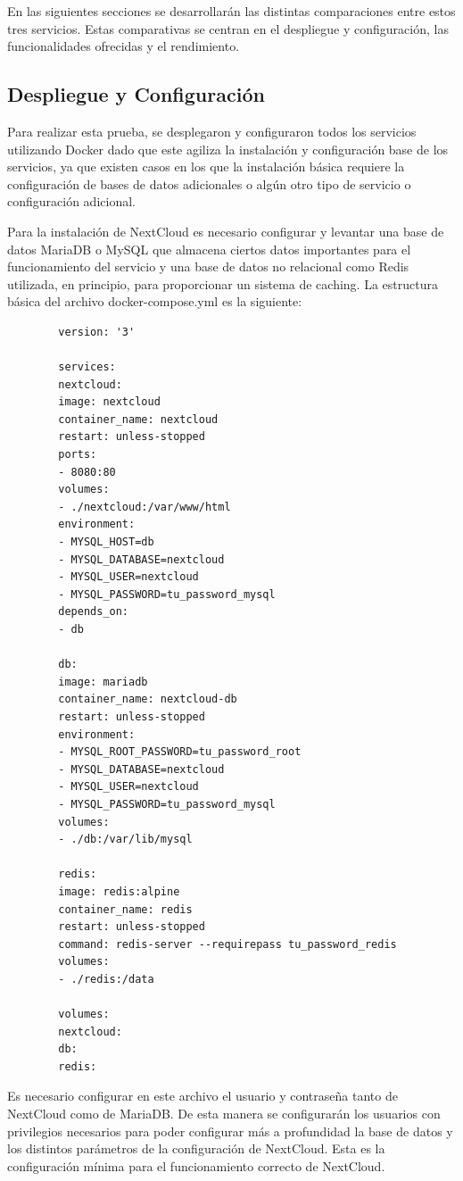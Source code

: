 \documentclass[a4paper,10pt]{article}
\begin{document}
	En las siguientes secciones se desarrollarán las distintas comparaciones entre estos tres servicios. Estas comparativas se centran en el despliegue y configuración, las funcionalidades ofrecidas y el rendimiento.
	
	\subsection{Despliegue y Configuración}
	Para realizar esta prueba, se desplegaron y configuraron todos los servicios utilizando Docker dado que este agiliza la instalación y configuración base de los servicios, ya que existen casos en los que la instalación básica requiere la configuración de bases de datos adicionales o algún otro tipo de servicio o configuración adicional.

	Para la instalación de NextCloud es necesario configurar y levantar una base de datos MariaDB o MySQL que almacena ciertos datos importantes para el funcionamiento del servicio y una base de datos no relacional como Redis utilizada, en principio, para proporcionar un sistema de caching. La estructura básica del archivo docker-compose.yml es la siguiente:

	
	\begin{verbatim}
		version: '3'
		
		services:
		nextcloud:
		image: nextcloud
		container_name: nextcloud
		restart: unless-stopped
		ports:
		- 8080:80
		volumes:
		- ./nextcloud:/var/www/html
		environment:
		- MYSQL_HOST=db
		- MYSQL_DATABASE=nextcloud
		- MYSQL_USER=nextcloud
		- MYSQL_PASSWORD=tu_password_mysql
		depends_on:
		- db
		
		db:
		image: mariadb
		container_name: nextcloud-db
		restart: unless-stopped
		environment:
		- MYSQL_ROOT_PASSWORD=tu_password_root
		- MYSQL_DATABASE=nextcloud
		- MYSQL_USER=nextcloud
		- MYSQL_PASSWORD=tu_password_mysql
		volumes:
		- ./db:/var/lib/mysql
		
		redis:
		image: redis:alpine
		container_name: redis
		restart: unless-stopped
		command: redis-server --requirepass tu_password_redis
		volumes:
		- ./redis:/data
		
		volumes:
		nextcloud:
		db:
		redis:
	\end{verbatim}
	
	Es necesario configurar en este archivo el usuario y contraseña tanto de NextCloud como de MariaDB. De esta manera se configurarán los usuarios con privilegios necesarios para poder configurar más a profundidad la base de datos y los distintos parámetros de la configuración de NextCloud. Esta es la configuración mínima para el funcionamiento correcto de NextCloud.
\end{document}
